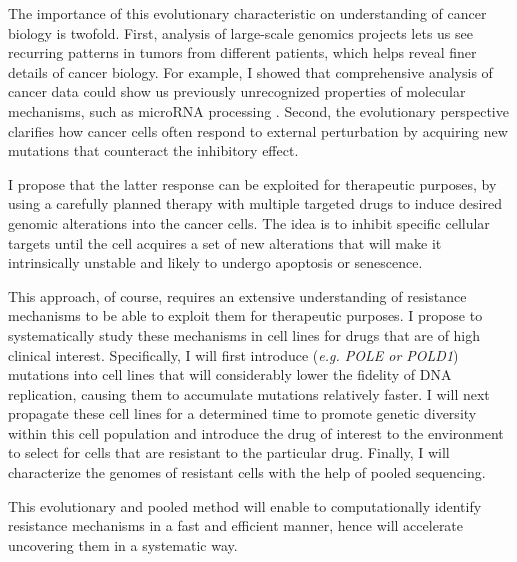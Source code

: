 \documentclass[11pt,letterpaper]{article}
\begin{document}
The importance of this evolutionary characteristic on understanding of cancer biology is twofold.
First, analysis of large-scale genomics projects lets us see recurring patterns in tumors from different patients, which helps reveal finer details of cancer biology.
For example, I showed that comprehensive analysis of cancer data could show us previously unrecognized properties of molecular mechanisms, such as microRNA processing \cite{aksoy2014cancer}.
Second, the evolutionary perspective clarifies how cancer cells often respond to external perturbation by acquiring new mutations that counteract the inhibitory effect.

I propose that the latter response can be exploited for therapeutic purposes,
by using a carefully planned therapy with multiple targeted drugs to induce desired genomic alterations into the cancer cells.
The idea is to inhibit specific cellular targets until the cell acquires a set of new alterations that will make it intrinsically unstable and likely to undergo apoptosis or senescence.

This approach, of course, requires an extensive understanding of resistance mechanisms to be able to exploit them for therapeutic purposes.
I propose to systematically study these mechanisms in cell lines for drugs that are of high clinical interest.
Specifically, I will first introduce (\textit{e.g. POLE or POLD1}) mutations into cell lines that will considerably lower the fidelity of DNA replication,
causing them to accumulate mutations relatively faster.
I will next propagate these cell lines for a determined time to promote genetic diversity within this cell population
and introduce the drug of interest to the environment to select for cells that are resistant to the particular drug.
Finally, I will characterize the genomes of resistant cells with the help of pooled sequencing.

This evolutionary and pooled method will enable to computationally identify resistance mechanisms in a fast and efficient manner, hence will accelerate uncovering them in a systematic way.

\clearpage

\footnotesize{
{}
}
\end{document}
